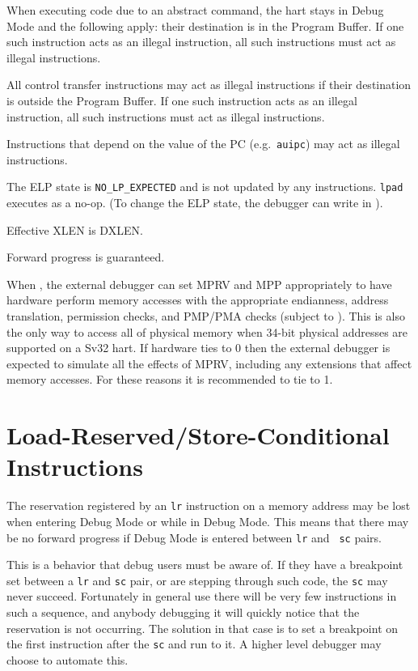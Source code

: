 \begin{steps}{When executing code due to an abstract command, the hart stays in
    Debug Mode and the following apply:}
    their destination is in the Program Buffer. If one such instruction acts as
    an illegal instruction, all such instructions must act as illegal
    instructions.
\item All control transfer instructions may act as illegal instructions if
    their destination is outside the Program Buffer. If one such instruction
    acts as an illegal instruction, all such instructions must act as
    illegal instructions.
\item Instructions that depend on the value of the PC (e.g.\ {\tt auipc}) may act
    as illegal instructions.
\item The ELP state is {\tt NO\_LP\_EXPECTED} and is not updated by any
    instructions. {\tt lpad} executes as a no-op. (To change the ELP state, the
    debugger can write \FcsrDcsrElp in \RcsrDcsr).
\item Effective XLEN is DXLEN.
\item Forward progress is guaranteed.
\end{steps}

\begin{commentary}
    When , the external debugger can set MPRV and MPP appropriately to
    have hardware perform memory accesses with the appropriate endianness, address
    translation, permission checks, and PMP/PMA checks (subject to \FdmAbstractcsRelaxedpriv).
    This is also the only way to access all of physical memory when 34-bit physical
    addresses are supported on a Sv32 hart. If hardware ties \FcsrDcsrMprven to 0 then the
    external debugger is expected to simulate all the effects of MPRV, including
    any extensions that affect memory accesses.
    For these reasons it is recommended to tie \FcsrDcsrMprven to 1.
\end{commentary}

\section{Load-Reserved/Store-Conditional Instructions}

The reservation registered by an {\tt lr} instruction on a memory address may
be lost when entering Debug Mode or while in Debug Mode.  This means that there
may be no forward progress if Debug Mode is entered between {\tt lr} and {\tt
sc} pairs.

\begin{commentary}
    This is a behavior that debug users must be aware of. If they have a
    breakpoint set between a {\tt lr} and {\tt sc} pair, or are stepping
    through such code, the {\tt sc} may never succeed.  Fortunately in general use
    there will be very few instructions in such a sequence, and anybody
    debugging it will quickly notice that the reservation is not occurring.
    The solution in that case is to set a breakpoint on the first instruction
    after the {\tt sc} and run to it. A higher level debugger may choose to
    automate this.
\end{commentary}

